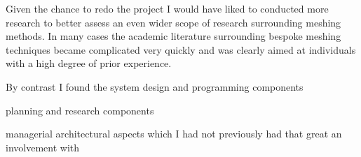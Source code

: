 \noindent
Given the chance to redo the project I would have liked to conducted more research to better assess an even wider scope of research surrounding meshing methods. In many cases the academic literature surrounding bespoke meshing techniques became complicated very quickly and was clearly aimed at individuals with a high degree of prior experience.



By contrast I found the system design and programming components 


planning and research components 

managerial architectural aspects which I had not previously had that great an involvement with











